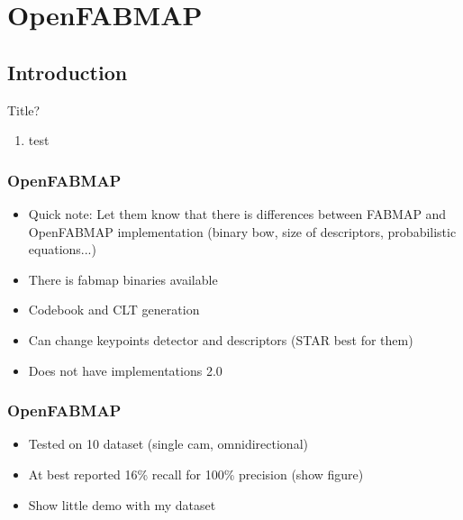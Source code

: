 \section{OpenFABMAP}

\subsection{Introduction}
\begin{frame}{Title?}
   \begin{enumerate}
       \item test
   \end{enumerate} 
\end{frame}


\begin{frame}
    \frametitle{OpenFABMAP}
    \begin{itemize}
        \item Quick note: Let them know that there is differences between FABMAP and OpenFABMAP implementation (binary bow, size of descriptors, probabilistic equations...)
        \item There is fabmap binaries available
        \item Codebook and CLT generation
        \item Can change keypoints detector and descriptors (STAR best for them)
        \item Does not have implementations 2.0
    \end{itemize}
\end{frame}

\begin{frame}
    \frametitle{OpenFABMAP}
    \begin{itemize}
        \item Tested on 10 dataset (single cam, omnidirectional)
        \item At best reported 16\% recall for 100\% precision (show figure)
        \item Show little demo with my dataset
    \end{itemize}
\end{frame}
